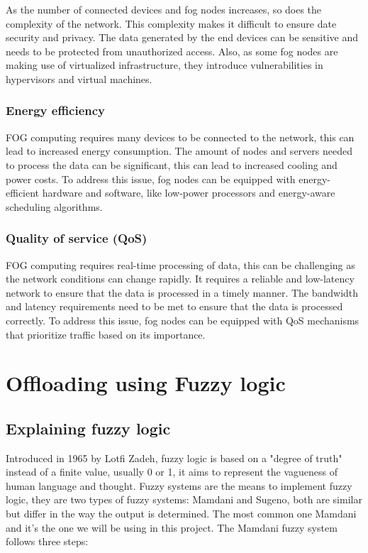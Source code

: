 As the number of connected devices and fog nodes increases, so does the complexity of the network. This complexity makes
it difficult to ensure date security and privacy. The data generated by the end devices can be sensitive and needs to be
protected from unauthorized access. Also, as some fog nodes are making use of virtualized infrastructure, they
introduce vulnerabilities in hypervisors and virtual machines.

\subsection{Energy efficiency}
\label{subsec:fog-energy}

FOG computing requires many devices to be connected to the network, this can lead to increased energy consumption. The
amount of nodes and servers needed to process the data can be significant, this can lead to increased cooling and power
costs. To address this issue, fog nodes can be equipped with energy-efficient hardware and software, like low-power
processors and energy-aware scheduling algorithms.

\subsection{Quality of service (QoS)}

FOG computing requires real-time processing of data, this can be challenging as the network conditions can change rapidly.
It requires a reliable and low-latency network to ensure that the data is processed in a timely manner. The bandwidth
and latency requirements need to be met to ensure that the data is processed correctly. To address this issue, fog nodes
can be equipped with QoS mechanisms that prioritize traffic based on its importance.

\chapter{Offloading using Fuzzy logic}
\label{chap:fuzzy}

\section{Explaining fuzzy logic}
\label{sec:fuzzy-explanation}

Introduced in 1965 by Lotfi Zadeh,\cite{zadeh-1965} fuzzy logic is based on a "degree of truth" instead of a finite
value, usually 0 or 1, it aims to represent the vagueness of human language and thought. Fuzzy systems are the means
to implement fuzzy logic, they are two types of fuzzy systems: Mamdani and Sugeno, both are similar but differ in the
way the output is determined. The most common one Mamdani and it's the one we will be using in this project. The
Mamdani fuzzy system follows three steps:

